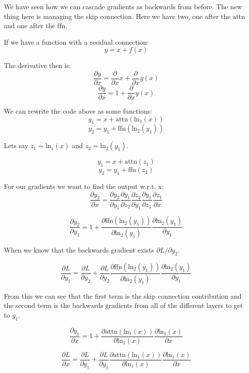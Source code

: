 \documentclass{article}
\begin{document}
We have seen how we can cascade gradients as backwards from before. The 
new thing here is managing the skip connection. Here we have two, one after
the $\text{attn}$ and one after the $\text{ffn}$.

If we have a function with a residual connection:
$$
y = x + f(x)
$$

The derivative then is:
$$
\frac{\partial y}{\partial x} = \frac{\partial}{\partial x}x +
\frac{\partial}{\partial x}y(x)
$$
$$
\frac{\partial y}{\partial x} = 1 +
\frac{\partial}{\partial x}y(x)
$$

We can rewrite the code above as some functions:
$$
y_1 = x + \text{attn}\left(\text{ln}_1\left(x\right)\right)
$$
$$
y_2 = y_1 + \text{ffn}\left(\text{ln}_2\left(y_1\right)\right)
$$

Lets say $z_1 = \text{ln}_1\left(x\right)$ and 
$z_2 = \text{ln}_2\left(y_1\right)$.

$$
y_1 = x + \text{attn}\left(z_1\right)
$$
$$
y_2 = y_1 + \text{ffn}\left(z_2\right)
$$


For our gradients we want to find the output w.r.t. x:
$$
\frac{\partial y_2}{\partial x} = 
\frac{\partial y_2}{\partial y_1}
\frac{\partial y_1}{\partial z_2}
\frac{\partial z_2}{\partial y_1}
\frac{\partial y_1}{\partial z_1}
\frac{\partial z_1}{\partial x}
$$

$$
\frac{\partial y_2}{\partial y_1} = 
1 + 
\frac{\partial \text{ffn}(\text{ln}_2(y_1))}{\partial \text{ln}_2(y_1)}
\frac{\partial \text{ln}_2(y_1)}{\partial y_1}
$$

When we know that the backwards gradient exists 
$\partial L / \partial y_2$.

$$
\frac{\partial L}{\partial y_1} = 
\frac{\partial L}{\partial y_2} + 
\frac{\partial L}{\partial y_2}
\frac{\partial \text{ffn}(\text{ln}_2(y_1))}{\partial \text{ln}_2(y_1)}
\frac{\partial \text{ln}_2(y_1)}{\partial y_1}
$$

From this we can see that the first term is the skip connection 
contribution and the second term is the backwards gradients from all of
the different layers to get to $y_1$.

$$
\frac{\partial y_1}{\partial x} = 
1 + 
\frac{\partial \text{attn}(\text{ln}_1(x))}{\partial \text{ln}_1(x)}
\frac{\partial \text{ln}_1(x)}{\partial x}
$$

$$
\frac{\partial L}{\partial x} = 
\frac{\partial L}{\partial y_1} + 
\frac{\partial L}{\partial y_1}
\frac{\partial \text{attn}(\text{ln}_1(x))}{\partial \text{ln}_1(x)}
\frac{\partial \text{ln}_1(x)}{\partial x}
$$
\end{document}
